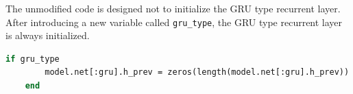 The unmodified code is designed not to initialize the GRU type recurrent layer.
After introducing a new variable called {\tt gru\_type}, the GRU type recurrent layer is always initialized.

\begin{lstlisting}[caption=Changed code 
,label=list:julia_06_vec, escapechar=!, language=Pascal, frame=single]
    if gru_type
        model.net[:gru].h_prev = zeros(length(model.net[:gru].h_prev))
    end
\end{lstlisting}
